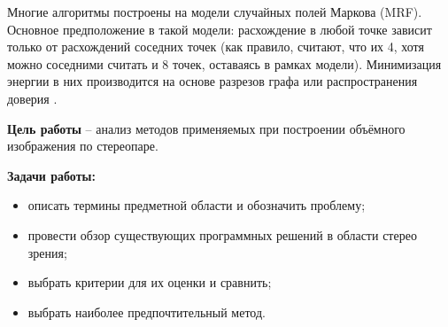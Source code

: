Многие алгоритмы построены на модели случайных полей Маркова (MRF). Основное предположение в такой модели: расхождение в любой точке зависит только от расхождений соседних точек
(как правило, считают, что их 4, хотя можно соседними считать
и 8 точек, оставаясь в рамках модели). Минимизация энергии в
них производится на основе разрезов графа или распространения
доверия \cite{10}.

\textbf{Цель работы} – анализ методов применяемых при построении объёмного изображения по стереопаре.

\textbf{Задачи работы:}
\begin{itemize}
	\item описать термины предметной области и обозначить проблему;
	\item провести обзор существующих программных решений в области стерео зрения;
	\item выбрать критерии для их оценки и сравнить;
	\item выбрать наиболее предпочтительный метод.
\end{itemize}
